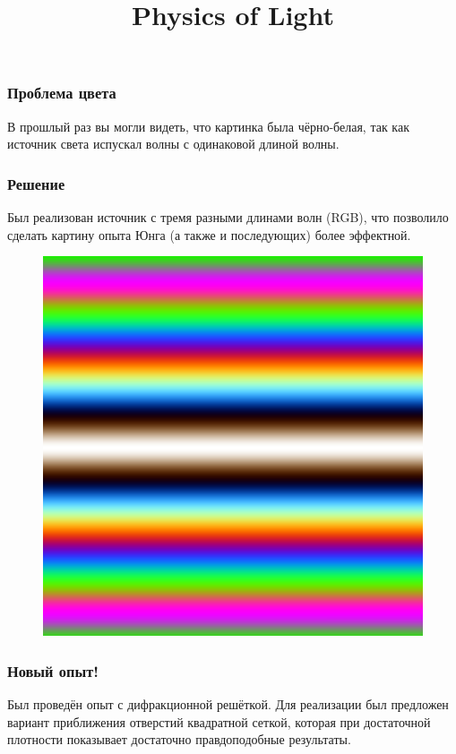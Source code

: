 \documentclass{beamer}
\title{Physics of Light}
\begin{document}
\begin{frame}
  \titlepage
\end{frame}

\begin{frame}
  \frametitle{Проблема цвета}

  В прошлый раз вы могли видеть, что картинка была чёрно-белая, так как источник света испускал волны с одинаковой длиной волны.
\end{frame}

\begin{frame}
  \frametitle{Решение}

  Был реализован источник с тремя разными длинами волн (RGB), что позволило сделать картину опыта Юнга (а также и последующих) более эффектной.

  \begin{figure}[c]
    \includegraphics[scale=0.3]{assets/colorYung.png}
  \end{figure}
\end{frame}

\begin{frame}
  \frametitle{Новый опыт!}

  Был проведён опыт с дифракционной решёткой. Для реализации был предложен вариант приближения отверстий квадратной сеткой, которая при достаточной плотности показывает достаточно правдоподобные результаты.
\end{frame}
\end{document}

